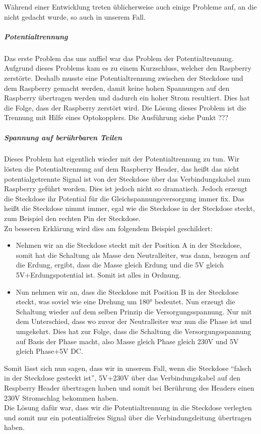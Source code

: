 Während einer Entwicklung treten üblicherweise auch einige Probleme auf, an die nicht gedacht wurde, so auch in unserem Fall.\\
\subparagraph{Potentialtrennung}\label{sec:report_hardware_pot}
Das erste Problem das uns auffiel war das Problem der Potentialtrennung. Aufgrund dieses Problems kam es zu einem Kurzschluss, welcher den Raspberry zerstörte. Deshalb musste eine Potentialtrennung zwischen der Steckdose und dem Raspberry gemacht werden, damit keine hohen Spannungen auf den Raspberry übertragen werden und dadurch ein hoher Strom resultiert. Dies hat die Folge, dass der Raspberry zerstört wird. Die Lösung dieses Problem ist die Trennung mit Hilfe eines Optokopplers. Die Ausführung siehe Punkt ??? \\
\subparagraph{Spannung auf berührbaren Teilen}\label{sec:report_hardware_spannung}
Dieses Problem hat eigentlich wieder mit der Potentialtrennung zu tun. Wir lösten die Potentialtrennung auf dem Raspberry Header, das heißt das nicht potentialgetrennte Signal ist von der Steckdose über das Verbindungskabel zum Raspberry geführt worden. Dies ist jedoch nicht so dramatisch. Jedoch erzeugt die Steckdose ihr Potential für die Gleichspannungsversorgung immer fix. Das heißt die Steckdose nimmt immer, egal wie die Steckdose in der Steckdose steckt, zum Beispiel den rechten Pin der Steckdose.\\
Zu besseren Erklärung wird dies am folgendem Beispiel geschildert:\\
\begin{itemize}
	\item Nehmen wir an die Steckdose steckt mit der Position A in der Steckdose, somit hat die Schaltung als Masse den Neutralleiter, was dann, bezogen auf die Erdung, ergibt, dass die Masse gleich Erdung und die  5V gleich 5V+Erdungspotential ist. Somit ist alles in Ordnung.
	\item Nun nehmen wir an, dass die Steckdose mit Position B in der Steckdose steckt, was soviel wie eine Drehung um 180° bedeutet. Nun erzeugt die Schaltung wieder auf dem selben Prinzip die Versorgungsspannung. Nur mit dem Unterschied, dass wo zuvor der Neutralleiter war nun die Phase ist und umgekehrt. Dies hat zur Folge, dass die Schaltung die Versorgungsspannung auf Basis der Phase macht, also Masse gleich Phase gleich 230V und 5V gleich Phase+5V DC.
\end{itemize}
Somit lässt sich nun sagen, dass wir in unserem Fall, wenn die Steckdose \enquote{falsch in der Steckdose gesteckt ist}, 5V+230V über das Verbindungskabel auf den Respberry Header übertragen haben und somit bei Berührung des Headers einen 230V Stromschlag bekommen haben.\\
Die Lösung dafür war, dass wir die Potentialtrennung in die Steckdose verlegten und somit nur ein potentialfreies Signal über die Verbindungsleitung übertragen haben.